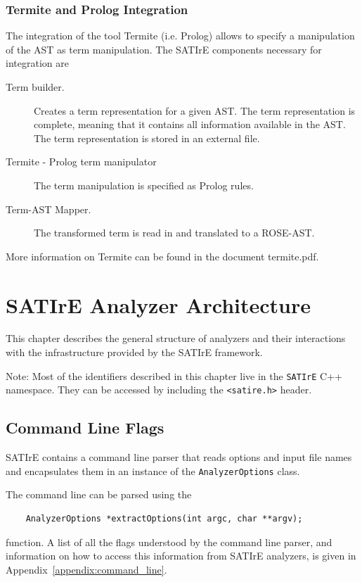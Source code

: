 \documentclass[a4paper,12pt]{report}
\begin{document}
\subsection{Termite and Prolog Integration}

The integration of the tool Termite (i.e. Prolog) allows to specify a manipulation of the AST as term manipulation. The SATIrE components necessary for integration are

\begin{description}
\item[Term builder.] Creates a term representation for a given AST. The term representation is complete, meaning that it contains all information available in the AST. The term representation is stored in an external file.
\item[Termite - Prolog term manipulator] The term manipulation is specified as Prolog rules.
\item[Term-AST Mapper.] The transformed term is read in and translated
to a ROSE-AST.
\end{description}

More information on Termite can be found in the document termite.pdf.


\chapter{SATIrE Analyzer Architecture}
\label{chap:analyzer}

This chapter describes the general structure of analyzers and their
interactions with the infrastructure provided by the SATIrE framework.

Note: Most of the identifiers described in this chapter live in the
\texttt{SATIrE} C++ namespace. They can be accessed by including the
\verb|<satire.h>| header.

\section{Command Line Flags}
\label{sec:command_line}

SATIrE contains a command line parser that reads options and input file
names and encapsulates them in an instance of the \texttt{AnalyzerOptions}
class.

The command line can be parsed using the
\begin{verbatim}
    AnalyzerOptions *extractOptions(int argc, char **argv);
\end{verbatim}
function. A list of all the flags understood by the command line parser, and
information on how to access this information from SATIrE analyzers, is
given in Appendix~\ref{appendix:command_line}.
\end{document}
